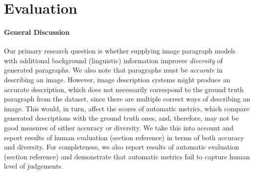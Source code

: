 \documentclass[11pt,a4paper]{article}
\begin{document}

\section{Evaluation}

\paragraph{General Discussion}
Our primary research question is whether supplying image paragraph models with additional background (linguistic) information improves \textit{diversity} of generated paragraphs.
We also note that paragraphs must be \textit{accurate} in describing an image.
However, image description systems might produce an accurate description, which does not necessarily correspond to the ground truth paragraph from the dataset, since there are multiple correct ways of describing an image.
This would, in turn, affect the scores of automatic metrics, which compare generated descriptions with the ground truth ones, and, therefore, may not be good measures of either accuracy or diversity.
We take this into account and report results of human evaluation (section reference) in terms of both accuracy and diversity.
For completeness, we also report results of automatic evaluation (section reference) and demonstrate that automatic metrics fail to capture human level of judgements.
\end{document}
